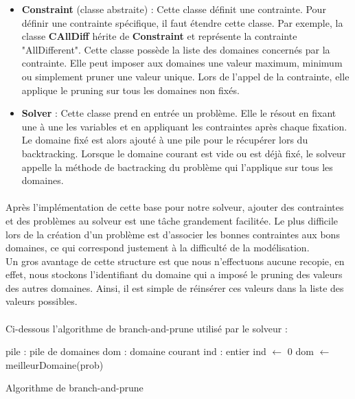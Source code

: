 \begin{itemize}
    \item \textbf{Constraint} (classe abstraite) : Cette classe définit une contrainte. Pour définir une contrainte spécifique, il faut étendre cette classe. Par exemple, la classe \textbf{CAllDiff} hérite de \textbf{Constraint} et représente la contrainte "AllDifferent". Cette classe possède la liste des domaines concernés par la contrainte. Elle peut imposer aux domaines une valeur maximum, minimum ou simplement pruner une valeur unique. Lors de l'appel de la contrainte, elle applique le pruning sur tous les domaines non fixés.
    
    \item \textbf{Solver} :  Cette classe prend en entrée un problème. Elle le résout en fixant une à une les variables et en appliquant les contraintes après chaque fixation. Le domaine fixé est alors ajouté à une pile pour le récupérer lors du backtracking. Lorsque le domaine courant est vide ou est déjà fixé, le solveur appelle la méthode de bactracking du problème qui l'applique sur tous les domaines.
\end{itemize}

\paragraph{}
Après l'implémentation de cette base pour notre solveur, ajouter des contraintes et des problèmes au solveur est une tâche grandement facilitée. Le plus difficile lors de la création d'un problème est d'associer les bonnes contraintes aux bons domaines, ce qui correspond justement à la difficulté de la modélisation.\\

Un gros avantage de cette structure est que nous n'effectuons aucune recopie, en effet, nous stockons l'identifiant du domaine qui a imposé le pruning des valeurs des autres domaines. Ainsi, il est simple de réinsérer ces valeurs dans la liste des valeurs possibles.

\paragraph{}
Ci-dessous l'algorithme de branch-and-prune utilisé par le solveur :
\newline

\begin{algorithm}[H]
 pile : pile de domaines\;
 dom : domaine courant\;
 ind : entier\;
 ind $\leftarrow$ 0\;
 dom $\leftarrow$ meilleurDomaine(prob)\;
  {
   {
   }
 }
 \caption{Algorithme de branch-and-prune}
\end{algorithm}
